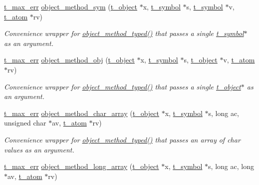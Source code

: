\begin{DoxyCompactItemize}
\hyperlink{group__datatypes_ga73edaae82b318855cc09fac994918165}{t\_\-max\_\-err} \hyperlink{group__obj_ga5ddeb48f167ded23b1508d502e571427}{object\_\-method\_\-sym} (\hyperlink{structt__object}{t\_\-object} $\ast$x, \hyperlink{structt__symbol}{t\_\-symbol} $\ast$s, \hyperlink{structt__symbol}{t\_\-symbol} $\ast$v, \hyperlink{structt__atom}{t\_\-atom} $\ast$rv)
\begin{DoxyCompactList}\small\item\em Convenience wrapper for \hyperlink{group__obj_ga443dee482af22e0fe83e68955d367226}{object\_\-method\_\-typed()} that passes a single \hyperlink{structt__symbol}{t\_\-symbol}$\ast$ as an argument. \item\end{DoxyCompactList}\item 
\hyperlink{group__datatypes_ga73edaae82b318855cc09fac994918165}{t\_\-max\_\-err} \hyperlink{group__obj_ga5432f19c374fb8850faa7ff062561db0}{object\_\-method\_\-obj} (\hyperlink{structt__object}{t\_\-object} $\ast$x, \hyperlink{structt__symbol}{t\_\-symbol} $\ast$s, \hyperlink{structt__object}{t\_\-object} $\ast$v, \hyperlink{structt__atom}{t\_\-atom} $\ast$rv)
\begin{DoxyCompactList}\small\item\em Convenience wrapper for \hyperlink{group__obj_ga443dee482af22e0fe83e68955d367226}{object\_\-method\_\-typed()} that passes a single \hyperlink{structt__object}{t\_\-object}$\ast$ as an argument. \item\end{DoxyCompactList}\item 
\hyperlink{group__datatypes_ga73edaae82b318855cc09fac994918165}{t\_\-max\_\-err} \hyperlink{group__obj_ga8d2c36fbeff377ea30d4ac9d898a3d77}{object\_\-method\_\-char\_\-array} (\hyperlink{structt__object}{t\_\-object} $\ast$x, \hyperlink{structt__symbol}{t\_\-symbol} $\ast$s, long ac, unsigned char $\ast$av, \hyperlink{structt__atom}{t\_\-atom} $\ast$rv)
\begin{DoxyCompactList}\small\item\em Convenience wrapper for \hyperlink{group__obj_ga443dee482af22e0fe83e68955d367226}{object\_\-method\_\-typed()} that passes an array of char values as an argument. \item\end{DoxyCompactList}\item 
\hyperlink{group__datatypes_ga73edaae82b318855cc09fac994918165}{t\_\-max\_\-err} \hyperlink{group__obj_ga76c93edf094492b8f485b7a401c616b6}{object\_\-method\_\-long\_\-array} (\hyperlink{structt__object}{t\_\-object} $\ast$x, \hyperlink{structt__symbol}{t\_\-symbol} $\ast$s, long ac, long $\ast$av, \hyperlink{structt__atom}{t\_\-atom} $\ast$rv)

\end{DoxyCompactItemize}

